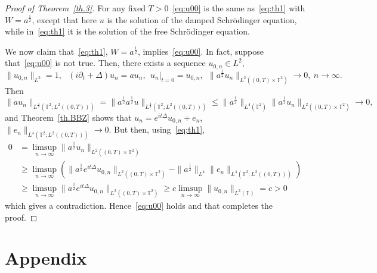 \documentclass[10pt]{amsart}
\theoremstyle{definition}\newtheorem{defi}[theo]{Definition}\newtheorem{rema}[theo]{Remark}\newtheorem{exam}[theo]{Example}\newtheorem{exem}[theo]{Example}\newtheorem{nota}[theo]{Notation}
\newcommand{\TT}{{\mathbb T}}
\begin{document}
\begin{proof}[Proof of Theorem~\ref{th.3}]
For any fixed $T>0$~\eqref{eq:u00} is the same as~\eqref{eq:th1} with $ W = a^{\frac12} $, except that here $u$ is the solution of the damped Schrödinger equation, while in~\eqref{eq:th1} it is the solution of the free Schrödinger equation.

We now claim that~\eqref{eq:th1}, $ W = a^{\frac12} $, implies~\eqref{eq:u00}. In fact, suppose that~\eqref{eq:u00} is not true. Then, there exists a sequence $ u_{0,n} \in L^2 $,
\[
\| u_{0,n} \|_{L^2} =1, \ \ \ (i \partial_t + \Delta)u_n = a u_n, \ \ u_n|_{t=0} = u_{0,n}, \ \
\| a^{\frac12} u_n \|_{ L^2 ((0, T) \times \TT^2) } \to 0, \ n\to \infty.
\]
Then
\[
\| a u_n \|_{ L^{\frac43} (\TT^2; L^2 ((0, T))) } =
\| a^{\frac12} a^{\frac12} u \|_{ L^{\frac43} (\TT^2; L^2 ((0, T))) }
\leq \| a^{\frac12} \|_{L^4(\TT^2) }
\| a^{\frac12} u_n \|_{ L^2 ((0, T) \times \TT^2) } \to 0,
\]
and Theorem~\ref{th.BBZ} shows that $ u_n = e^{ it \Delta} u_{0,n} + e_n$, $ \| e_n \|_{ L^4 (\TT^2 ; L^2 ((0, T))) } \to 0 $. But then, using~\eqref{eq:th1},
\[
\begin{split} 0 & = \limsup_{n \to \infty } \| a^{\frac12} u_n \|_{L^2 ((0, T) \times \TT^2) }
\\ &
\geq \limsup_{n \to \infty } \left(\| a^{\frac12} e^{ it \Delta } u_{ 0,n} \|_{ L^2 ((0, T) \times \TT^2) } - \| a^{\frac12} \|_{L^4 }
\| e_n \|_{ L^4 (\TT^2 ; L^2 ((0, T))) } \right) \\
& \geq
\limsup_{n \to \infty } \| a^{\frac12} e^{ it \Delta } u_{ 0,n} \|_{ L^2 ((0, T) \times \TT^2) } \geq c
\limsup_{n\to \infty } \| u_{0,n}\|_{L^2 (\TT)} = c > 0
\end{split}
\]
which gives a contradiction. Hence~\eqref{eq:u00} holds and that completes the proof.
\end{proof}

\appendix
\section*{Appendix}
\end{document}
